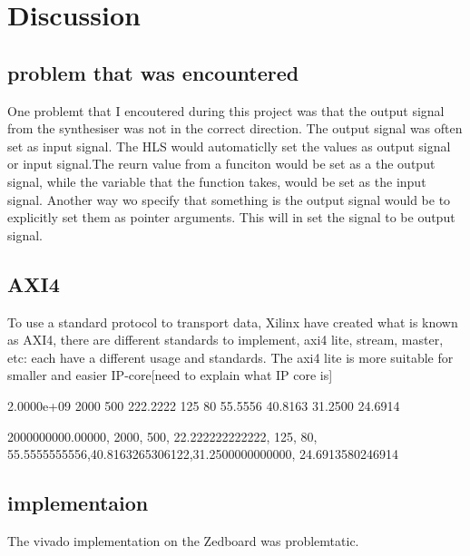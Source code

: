 \chapter{Discussion} \label{discussion}

\section{ problem that was encountered}
One problemt that I encoutered during this project was that the output signal from the synthesiser was not in the correct direction. The output signal was often set as input signal. The HLS would automaticlly set the values as output signal or input signal.The reurn value from a funciton would be set as a the output signal, while the variable that the function takes, would be set as the input signal. Another way wo specify that something is the output signal would be to explicitly set them as pointer arguments. This will in set the signal to be output signal.

\section{AXI4}
To use a standard protocol to transport data, Xilinx have created what is known as AXI4, there are different standards to implement, axi4 lite, stream, master, etc: each have a different usage and standards. The axi4 lite is more suitable for smaller and easier IP-core[need to explain what IP core is]


2.0000e+09	2000	500	222.2222	125	80	55.5556	40.8163	31.2500	24.6914

2000000000.00000, 2000, 500, 22.222222222222, 125, 80, 55.5555555556,40.8163265306122,31.2500000000000, 24.6913580246914

\section{implementaion}
The vivado implementation on the Zedboard was problemtatic.